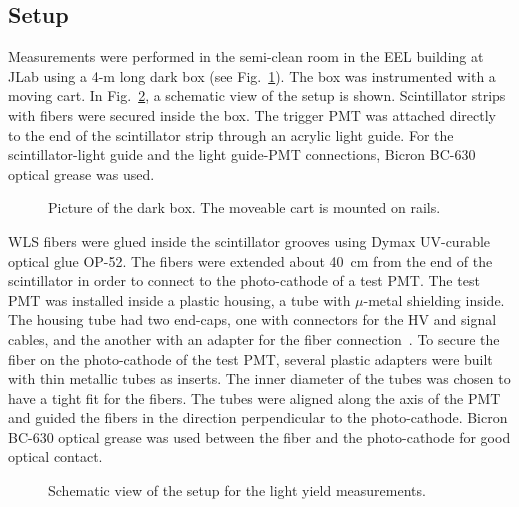 \subsection{Setup}

Measurements were performed in the semi-clean room in the EEL building at 
JLab using a 4-m long dark box (see Fig.~\ref{fig:dbox}).  The box was 
instrumented with a moving cart.  In Fig.~\ref{fig:setup}, a schematic view 
of the setup is shown.  Scintillator strips with fibers were secured inside 
the box.  The trigger PMT was attached directly to the end of the 
scintillator strip through an acrylic light guide.  For the 
scintillator-light guide and the light guide-PMT connections, Bicron BC-630 
optical grease was used. 

\begin{figure}[!tbh]
\vspace{110mm} 
\caption{\small{Picture of the dark box. The moveable cart is mounted on 
rails.}}
\label{fig:dbox}
\end{figure}

WLS fibers were glued inside the scintillator grooves using Dymax UV-curable 
optical glue OP-52.  The fibers were extended about 40~cm from the end of the 
scintillator in order to connect to the photo-cathode of a test PMT.  The 
test PMT was installed inside a plastic housing, a tube with $\mu$-metal 
shielding inside.  The housing tube had two end-caps, one with connectors for 
the HV and signal cables, and the another with an adapter for the fiber 
connection~\cite{adapter}.  To secure the fiber on the photo-cathode of the 
test PMT, several plastic adapters were built with thin metallic tubes as 
inserts.  The inner diameter of the tubes was chosen to have a tight fit for 
the fibers.  The tubes were aligned along the axis of the PMT and guided the 
fibers in the direction perpendicular to the photo-cathode.  Bicron BC-630 
optical grease was used between the fiber and the photo-cathode for good 
optical contact.     

\begin{figure}[!t]
\vspace{50mm} 
\caption{\small{Schematic view of the setup for the light yield measurements.}}
\label{fig:setup}
\end{figure}

